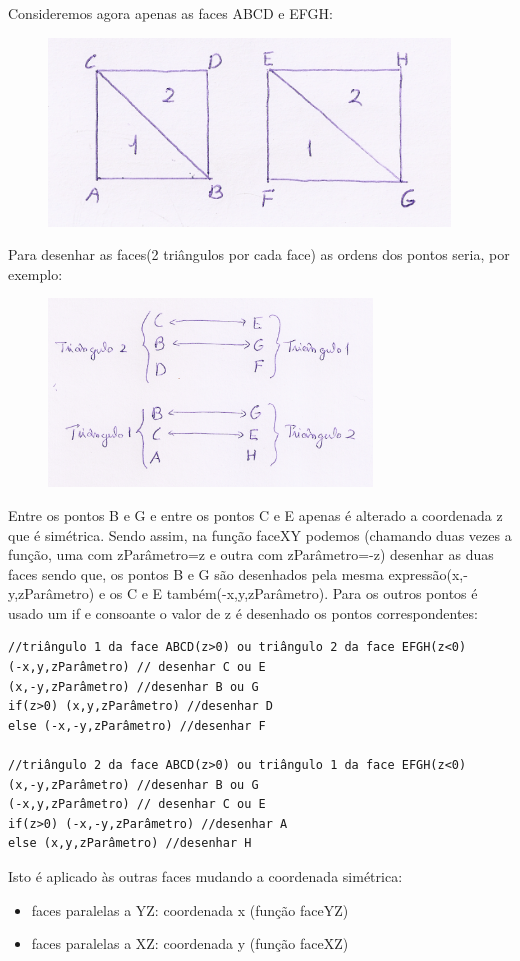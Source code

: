 \documentclass{article}
\begin{document}
Consideremos agora apenas as faces ABCD e EFGH:
\begin{figure}[H]
    \centering
    \includegraphics[height=5cm]{boxMath2.png}
\end{figure}
Para desenhar as faces(2 triângulos por cada face) as ordens dos pontos seria, por exemplo:
\begin{figure}[H]
    \centering
    \includegraphics[height=5cm]{boxMath3.png}
\end{figure}
Entre os pontos B e G e entre os pontos C e E apenas é alterado a coordenada z que é simétrica. Sendo assim, na função faceXY podemos (chamando duas vezes a função, uma com zParâmetro=z e outra com zParâmetro=-z) desenhar as duas faces sendo que, os pontos B e G são desenhados pela mesma expressão(x,-y,zParâmetro) e os C e E também(-x,y,zParâmetro). Para os outros pontos é usado um if e consoante o valor de z é desenhado os pontos correspondentes:
\begin{verbatim}
//triângulo 1 da face ABCD(z>0) ou triângulo 2 da face EFGH(z<0)
(-x,y,zParâmetro) // desenhar C ou E
(x,-y,zParâmetro) //desenhar B ou G
if(z>0) (x,y,zParâmetro) //desenhar D
else (-x,-y,zParâmetro) //desenhar F

//triângulo 2 da face ABCD(z>0) ou triângulo 1 da face EFGH(z<0)
(x,-y,zParâmetro) //desenhar B ou G
(-x,y,zParâmetro) // desenhar C ou E
if(z>0) (-x,-y,zParâmetro) //desenhar A
else (x,y,zParâmetro) //desenhar H
\end{verbatim}
Isto é aplicado às outras faces mudando a coordenada simétrica:
\begin{itemize}
    \item faces paralelas a YZ: coordenada x (função faceYZ)
    \item faces paralelas a XZ: coordenada y (função faceXZ) 
\end{itemize}
\end{document}
